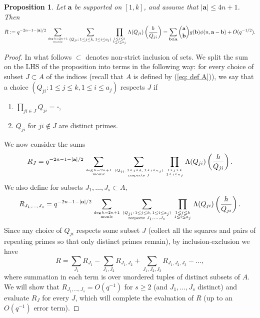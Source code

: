 \documentclass[alphabetic, 
        colorlinks,
        linkcolor=red,  citecolor=blue,
        backref
]{amsart}
\numberwithin{equation}{section}
\newtheorem{prop}[claim]{Proposition}
\theoremstyle{definition}
\begin{document}
\begin{prop}\label{prop_main_sum_estimate}
    Let $\mathbf a$ be supported on $[1,k]$, and assume that $|\mathbf a|\le 4n+1$. Then
    \begin{equation*}
    R:=q^{-2n-1-|\mathbf a|/2}\sum_{\deg h=2n+1\atop{\mathrm{monic}}}\sum_{(Q_{ji}:\,1\le j\le k,\,1\le i\le a_j)}\prod_{1\le j\le k\atop{1\le i\le a_j}}\Lambda(Q_{ji})\left(\frac{h}{Q_{ji}}\right)
    =\sum_{\mathbf b\le\mathbf a}{\mathbf a\choose\mathbf b}g(\mathbf b)\phi(n,\mathbf a-\mathbf b)+O(q^{-{1/2}}).
    \end{equation*}
\end{prop}

\begin{proof} In what follows $\subset$ denotes non-strict inclusion of sets. We split the sum on the LHS of the proposition into terms in the following way: for every choice of subset $J\subset A$ of the indices (recall that $A$ is defined by (\ref{eq: def A})), we say that a choice $(Q_{ji}:1\le j\le k,1\le i\le a_j)$ respects $J$ if
\begin{enumerate}
    \item[(i)] $\prod_{ji\in J}Q_{ji}=\square$,
    \item[(ii)] $Q_{ji}$ for $ji\notin J$ are distinct primes.
\end{enumerate} We now consider the sums 
$$
R_J=q^{-2n-1-|\mathbf a|/2}
\sum_{\deg h=2n+1\atop{\mathrm{monic}}}
\sum_
{(Q_{ji}:\,1\le j\le k,\,1\le i\le a_j)\atop{\text{respects } J}
}
\prod_{1\le j\le k\atop{1\le i\le a_j}}\Lambda(Q_{ji})\left(\frac{h}{Q_{ji}}\right).
$$
We also define for subsets $J_1,\ldots,J_s\subset A$,
$$
R_{J_1,\ldots,J_s}=q^{-2n-1-|\mathbf a|/2}
\sum_{\deg h=2n+1\atop{\mathrm{monic}}}
\sum_
{(Q_{ji}:\,1\le j\le k,\,1\le i\le a_j)\atop{\text{respects } J_1,\ldots,J_s}
}
\prod_{1\le j\le k\atop{1\le i\le a_j}}\Lambda(Q_{ji})\left(\frac{h}{Q_{ji}}\right).
$$
Since any choice of $Q_{ji}$ respects some subset $J$ (collect all the squares and pairs of repeating primes so that only distinct primes remain), by inclusion-exclusion we have 
\begin{equation}\label{eq: inclusion-exclusion}
R =\sum_{J_1}R_{J_1}-\sum_{J_1,J_2}R_{J_1,J_2}+\sum_{J_1,J_2,J_3}R_{J_1,J_2,J_3}-\ldots,
\end{equation}
where summation in each term is over unordered tuples of distinct subsets of $A$.
We will show that $R_{J_1,\ldots,J_s}=O(q^{-1})$ for $s\ge 2$ (and $J_1,\ldots,J_s$ distinct) and evaluate $R_J$ for every $J$, which will complete the evaluation of $R$ (up to an $O(q^{-1})$ error term).



\end{proof}
\end{document}
